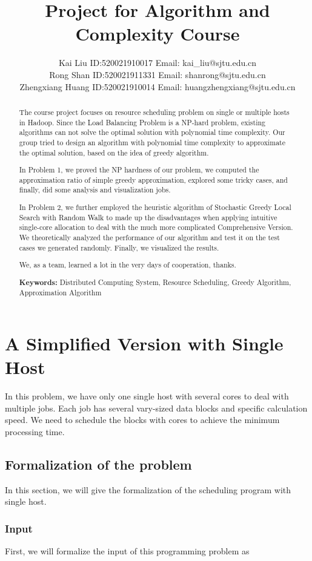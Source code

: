 \documentclass{article}
\title{Project for Algorithm and Complexity Course}
\author{Kai Liu \quad ID:520021910017 \quad Email: kai\_liu@sjtu.edu.cn\\
        Rong Shan \quad ID:520021911331 \quad Email: shanrong@sjtu.edu.cn\\
        Zhengxiang Huang \quad ID:520021910014 \quad Email: huangzhengxiang@sjtu.edu.cn
}
\begin{document}
\maketitle

\begin{abstract}

The course project focuses on resource scheduling problem on single or multiple hosts in Hadoop. Since the Load Balancing Problem is a NP-hard problem, existing algorithms can not solve the optimal solution with polynomial time complexity. Our group tried to design an algorithm with polynomial time complexity to approximate the optimal solution, based on the idea of greedy algorithm. 

In Problem 1, we proved the NP hardness of our problem, we computed the approximation ratio of simple greedy approximation, explored some tricky cases, and finally, did some analysis and visualization jobs. 

In Problem 2, we further employed the heuristic algorithm of Stochastic Greedy Local Search with Random Walk to made up the disadvantages when applying intuitive single-core allocation to deal with the much more complicated Comprehensive Version. We theoretically analyzed the performance of our algorithm and test it on the test cases we generated randomly. Finally, we visualized the results.

We, as a team, learned a lot in the very days of cooperation, thanks.

\textbf{Keywords:} Distributed Computing System, Resource Scheduling, Greedy Algorithm, Approximation Algorithm
\end{abstract}

\section{A Simplified Version with Single Host}
    In this problem, we have only one single host with several cores to deal with multiple jobs. Each job has several vary-sized data blocks and specific calculation speed. We need to schedule the blocks with cores to achieve the minimum processing time.
\subsection{Formalization of the problem}
    In this section, we will give the formalization of the scheduling program with single host.
    
    \subsubsection{Input}
        First, we will formalize the input of this programming problem as
        
\end{document}
